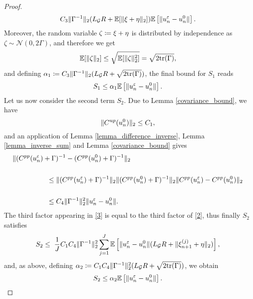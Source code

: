 \begin{proof}
\begin{equation*}
C_3 \lVert\Gamma^{-1}\rVert_2 (L_{\mathcal{G}} R + \mathbb{E} [\lVert\xi + \eta\rVert_2]) \mathbb{E} \left [ \lVert u_n^{\varepsilon} - u_n^0\rVert \right ].
\end{equation*}
Moreover, the random variable $\zeta \coloneqq \xi + \eta$ is distributed by independence as $\zeta \sim \mathcal{N}(0,2\Gamma)$, and therefore we get
\begin{equation*}
\mathbb{E}[\lVert\zeta\rVert_2] \le \sqrt{\mathbb{E}[\lVert\zeta\rVert_2^2]} = \sqrt{2\mathrm{tr}(\Gamma)},
\end{equation*}
and defining $\alpha_1 \coloneqq C_3 \lVert\Gamma^{-1}\rVert_2 (L_{\mathcal{G}} R + \sqrt{2\mathrm{tr}(\Gamma)})$, the final bound for $S_1$ reads
\begin{equation}
\label{bound2}
S_1 \leq \alpha_1 \mathbb{E} \left [ \lVert u_n^{\varepsilon} - u_n^0\rVert \right ].
\end{equation}
Let us now consider the second term $S_2$. Due to Lemma \ref{covariance_bound}, we have
\begin{equation}\label{boundCup}
\lVert C^{up}(u_n^0)\rVert_2 \le C_1,
\end{equation}
and an application of Lemma \ref{lemma_difference_inverse}, Lemma \ref{lemma_inverse_sum} and Lemma \ref{covariance_bound} gives
\begin{align*}
& \lVert(C^{pp}(u_n^{\varepsilon}) + \Gamma)^{-1} - (C^{pp}(u_n^0) + \Gamma)^{-1}\rVert_2 \\ \\
& \hspace{50pt} \le \lVert(C^{pp}(u_n^{\varepsilon}) + \Gamma)^{-1}\rVert_2 \lVert(C^{pp}(u_n^0) + \Gamma)^{-1}\rVert_2 \lVert C^{pp}(u_n^{\varepsilon}) - C^{pp}(u_n^0)\rVert_2 \\ \\
& \hspace{50pt} \le C_4 \lVert\Gamma^{-1}\rVert_2^2  \lVert u_n^{\varepsilon} - u_n^0\rVert.
\end{align*}
The third factor appearing in \eqref{3} is equal to the third factor of \eqref{2}, thus finally $S_2$ satisfies
\begin{equation*}
S_2 \leq \; \frac{1}{J} C_1 C_4 \lVert\Gamma^{-1}\rVert_2^2 \sum_{j=1}^J \mathbb{E} \left [ \lVert u_n^{\varepsilon} - u_n^0\rVert (L_{\mathcal{G}} R + \lVert\xi_{n+1}^{(j)} + \eta\rVert_2) \right ],
\end{equation*}
and, as above, defining $\alpha_2 \coloneqq C_1 C_4 \lVert\Gamma^{-1}\rVert_2^2 (L_{\mathcal{G}} R + \sqrt{2\mathrm{tr}(\Gamma)})$, we obtain
\begin{equation}
\label{bound3}
S_2 \leq \alpha_2 \mathbb{E} \left [ \norm{u_n^{\varepsilon} - u_n^0} \right ].

\end{equation}
\end{proof}
